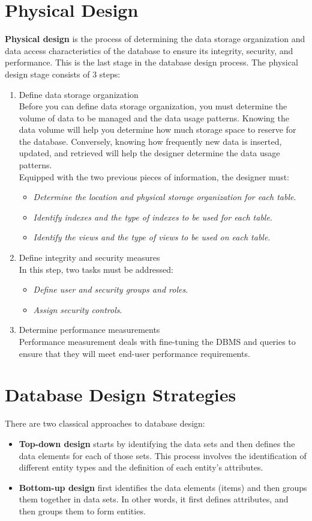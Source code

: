 \documentclass[a4paper, 12pt, titlepage]{report}
\begin{document}
\section{Physical Design}
\textbf{Physical design} is the process of determining the data storage organization and data access characteristics of the database to ensure its integrity, security, and performance. This is the last stage in the database design process. The physical design stage consists of 3 steps:
\begin{enumerate}
\item Define data storage organization
\\ Before you can define data storage organization, you must determine the volume of data to be managed and the data usage patterns. Knowing the data volume will help you determine how much storage space to reserve for the database. Conversely, knowing how frequently new data is inserted, updated, and retrieved will help the designer determine the data usage patterns.
\\Equipped with the two previous pieces of information, the designer must:
\begin{itemize}
\item \emph{Determine the location and physical storage organization for each table}.
\item \emph{Identify indexes and the type of indexes to be used for each table}.
\item \emph{Identify the views and the type of views to be used on each table}.
\end{itemize}
\item Define integrity and security measures
\\ In this step, two tasks must be addressed:
\begin{itemize}
\item \emph{Define user and security groups and roles}.
\item \emph{Assign security controls}.
\end{itemize}
\item Determine performance measurements
\\ Performance measurement deals with fine-tuning the DBMS and queries to ensure that they will meet end-user performance requirements.
\end{enumerate}
\section{Database Design Strategies}
There are two classical approaches to database design:
\begin{itemize}
\item \textbf{Top-down design} starts by identifying the data sets and then defines the data elements for each of those sets. This process involves the identification of different entity types and the definition of each entity’s attributes.
\item \textbf{Bottom-up design} first identifies the data elements (items) and then groups them together in data sets. In other words, it first defines attributes, and then groups them to form entities.
\end{itemize}
\end{document}
